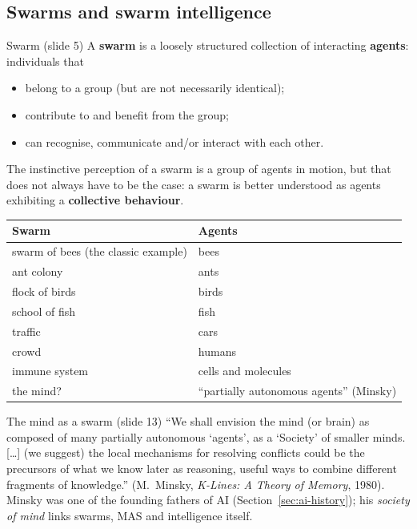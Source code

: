 \subsection{Swarms and swarm intelligence}
\label{sec:swarms}

\begin{nbdef}{Swarm (slide 5)}
A \textbf{swarm} is a loosely structured collection of interacting \textbf{agents}:
individuals that
\begin{itemize}[nosep]
  \item belong to a group (but are not necessarily identical);
  \item contribute to and benefit from the group;
  \item can recognise, communicate and/or interact with each other.
\end{itemize}
The instinctive perception of a swarm is a group of agents in motion, but that does not
always have to be the case: a swarm is better understood as agents exhibiting a
\textbf{collective behaviour}.
\end{nbdef}

\begin{center}
\small
\begin{tabular}{@{}ll@{}}
\toprule
\textbf{Swarm} & \textbf{Agents} \\
\midrule
swarm of bees (the classic example) & bees \\
ant colony & ants \\
flock of birds & birds \\
school of fish & fish \\
traffic & cars \\
crowd & humans \\
immune system & cells and molecules \\
the mind? & ``partially autonomous agents'' (Minsky) \\
\bottomrule
\end{tabular}
\end{center}

\begin{nbfact}{The mind as a swarm (slide 13)}
``We shall envision the mind (or brain) as composed of many partially autonomous `agents',
as a `Society' of smaller minds. [\ldots] (we suggest) the local mechanisms for resolving
conflicts could be the precursors of what we know later as reasoning, useful ways to
combine different fragments of knowledge.'' (M.~Minsky, \emph{K-Lines: A Theory of Memory},
1980). Minsky was one of the founding fathers of AI (Section~\ref{sec:ai-history}); his
\emph{society of mind} links swarms, MAS and intelligence itself.
\end{nbfact}

